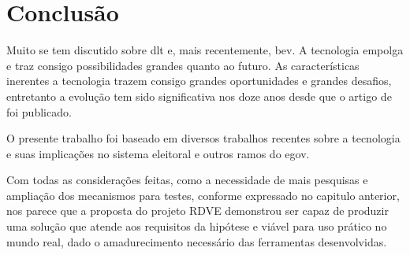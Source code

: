 \chapter{Conclusão}
Muito se tem discutido sobre \gls{dlt} e, mais recentemente, \gls{bev}. A tecnologia empolga e traz consigo possibilidades grandes quanto ao futuro. As características inerentes a tecnologia trazem consigo grandes oportunidades e grandes desafios, entretanto a evolução tem sido significativa nos doze anos desde que o artigo de  foi publicado. 

O presente trabalho foi baseado em diversos trabalhos recentes sobre a tecnologia e suas implicações no sistema eleitoral e outros ramos do \gls{egov}. 

Com todas as considerações feitas, como a necessidade de mais pesquisas e ampliação dos mecanismos para testes, conforme expressado no capitulo anterior, nos parece que a proposta do projeto RDVE demonstrou ser capaz de produzir uma solução que atende aos requisitos da hipótese e viável para uso prático no mundo real, dado o amadurecimento necessário das ferramentas desenvolvidas. 